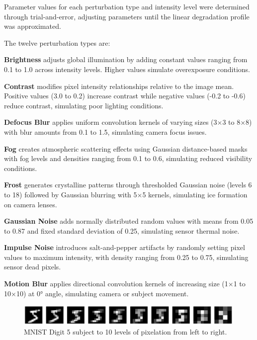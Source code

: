 Parameter values for each perturbation type and intensity level were determined through trial-and-error, adjusting parameters until the linear degradation profile was approximated.

The twelve perturbation types are:

\textbf{Brightness} adjusts global illumination by adding constant values ranging from 0.1 to 1.0 across intensity levels. Higher values simulate overexposure conditions.

\textbf{Contrast} modifies pixel intensity relationships relative to the image mean. Positive values (3.0 to 0.2) increase contrast while negative values (-0.2 to -0.6) reduce contrast, simulating poor lighting conditions.

\textbf{Defocus Blur} applies uniform convolution kernels of varying sizes (3×3 to 8×8) with blur amounts from 0.1 to 1.5, simulating camera focus issues.

\textbf{Fog} creates atmospheric scattering effects using Gaussian distance-based masks with fog levels and densities ranging from 0.1 to 0.6, simulating reduced visibility conditions.

\textbf{Frost} generates crystalline patterns through thresholded Gaussian noise (levels 6 to 18) followed by Gaussian blurring with 5×5 kernels, simulating ice formation on camera lenses.

\textbf{Gaussian Noise} adds normally distributed random values with means from 0.05 to 0.87 and fixed standard deviation of 0.25, simulating sensor thermal noise.

\textbf{Impulse Noise} introduces salt-and-pepper artifacts by randomly setting pixel values to maximum intensity, with density ranging from 0.25 to 0.75, simulating sensor dead pixels.

\textbf{Motion Blur} applies directional convolution kernels of increasing size (1×1 to 10×10) at 0° angle, simulating camera or subject movement.

\begin{figure}[h]
\centering
\includegraphics[width=0.99\textwidth]{Figures/Methods/Pixelation_Digit_5_1_to_10_intensity.png}
\caption{MNIST Digit 5 subject to 10 levels of pixelation from left to right.}
\label{fig:Pixelation_Digit_5_1_to_10_intensity}
\end{figure}


